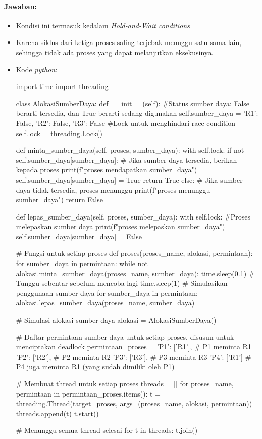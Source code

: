 \documentclass[12pt]{article}
\begin{document}
    \paragraph{Jawaban:} 
    \begin{itemize}
    \item Kondisi ini termasuk kedalam  \textit{Hold-and-Wait conditions}
    \item Karena siklus dari ketiga proses saling terjebak menuggu satu sama lain, sehingga tidak ada proses yang dapat melanjutkan eksekusinya.
    \item Kode \textit{python}:
\begin{python}
    import time
import threading

class AlokasiSumberDaya:
    def __init__(self):
        #Status sumber daya: False berarti tersedia, dan True berarti sedang digunakan
        self.sumber_daya = {'R1': False, 'R2': False, 'R3': False}
        #Lock untuk menghindari race condition
        self.lock = threading.Lock()  

    def minta_sumber_daya(self, proses, sumber_daya):
        with self.lock:
            if not self.sumber_daya[sumber_daya]:
    # Jika sumber daya tersedia, berikan kepada proses
                print(f"{proses} mendapatkan {sumber_daya}")
                self.sumber_daya[sumber_daya] = True
                return True
            else:
    # Jika sumber daya tidak tersedia, proses menunggu
                print(f"{proses} menunggu {sumber_daya}")
                return False

    def lepas_sumber_daya(self, proses, sumber_daya):
        with self.lock:
    #Proses melepaskan sumber daya
        print(f"{proses} melepaskan {sumber_daya}")
            self.sumber_daya[sumber_daya] = False

# Fungsi untuk setiap proses
def proses(proses_name, alokasi, permintaan):
    for sumber_daya in permintaan:
        while not alokasi.minta_sumber_daya(proses_name, sumber_daya):
            time.sleep(0.1)  # Tunggu sebentar sebelum mencoba lagi
    time.sleep(1)  # Simulasikan penggunaan sumber daya
    for sumber_daya in permintaan:
        alokasi.lepas_sumber_daya(proses_name, sumber_daya)

# Simulasi alokasi sumber daya
alokasi = AlokasiSumberDaya()

# Daftar permintaan sumber daya untuk setiap proses, disusun untuk menciptakan deadlock
permintaan_proses = {
    'P1': ['R1'],  # P1 meminta R1
    'P2': ['R2'],  # P2 meminta R2
    'P3': ['R3'],  # P3 meminta R3
    'P4': ['R1']   # P4 juga meminta R1 (yang sudah dimiliki oleh P1)
}

# Membuat thread untuk setiap proses
threads = []
for proses_name, permintaan in permintaan_proses.items():
    t = threading.Thread(target=proses, args=(proses_name, alokasi, permintaan))
    threads.append(t)
    t.start()

# Menunggu semua thread selesai
for t in threads:
    t.join()
\end{python}

      
    \end{itemize}
    
\end{document}

